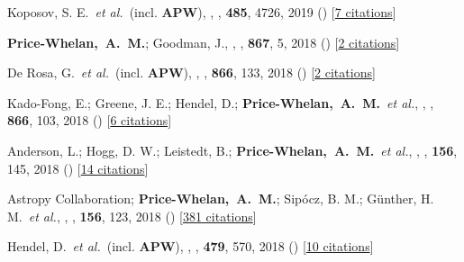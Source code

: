 \item[{\color{deemph}\scriptsize48}]Koposov, S. E.~\textit{et al.}~(incl. \textbf{APW}), , \mnras, \textbf{485}, 4726, 2019 () [\href{http://adsabs.harvard.edu/abs/2019MNRAS.485.4726K}{7 citations}]

\item[{\color{deemph}\scriptsize47}]\textbf{Price-Whelan,~A.~M.}; Goodman, J., , \apj, \textbf{867}, 5, 2018 () [\href{http://adsabs.harvard.edu/abs/2018ApJ...867....5P}{2 citations}]

\item[{\color{deemph}\scriptsize46}]De Rosa, G.~\textit{et al.}~(incl. \textbf{APW}), , \apj, \textbf{866}, 133, 2018 () [\href{http://adsabs.harvard.edu/abs/2018ApJ...866..133D}{2 citations}]

\item[{\color{deemph}\scriptsize45}]Kado-Fong, E.; Greene, J. E.; Hendel, D.; \textbf{Price-Whelan,~A.~M.}~\textit{et al.}, , \apj, \textbf{866}, 103, 2018 () [\href{http://adsabs.harvard.edu/abs/2018ApJ...866..103K}{6 citations}]

\item[{\color{deemph}\scriptsize44}]Anderson, L.; Hogg, D. W.; Leistedt, B.; \textbf{Price-Whelan,~A.~M.}~\textit{et al.}, , \aj, \textbf{156}, 145, 2018 () [\href{http://adsabs.harvard.edu/abs/2018AJ....156..145A}{14 citations}]

\item[{\color{deemph}\scriptsize43}]Astropy Collaboration; \textbf{Price-Whelan,~A.~M.}; Sip{\'{o}}cz, B. M.; G{\"u}nther, H. M.~\textit{et al.}, , \aj, \textbf{156}, 123, 2018 () [\href{http://adsabs.harvard.edu/abs/2018AJ....156..123A}{381 citations}]

\item[{\color{deemph}\scriptsize42}]Hendel, D.~\textit{et al.}~(incl. \textbf{APW}), , \mnras, \textbf{479}, 570, 2018 () [\href{http://adsabs.harvard.edu/abs/2018MNRAS.479..570H}{10 citations}]

